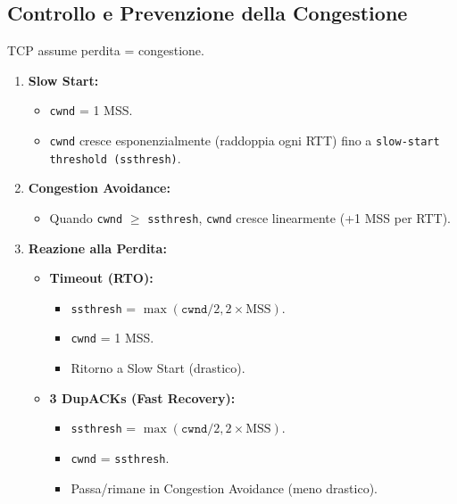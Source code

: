 \subsection{Controllo e Prevenzione della Congestione}
TCP assume perdita = congestione.
\begin{enumerate}
    \item \textbf{Slow Start:}
    \begin{itemize}
        \item \texttt{cwnd} = 1 MSS.
        \item \texttt{cwnd} cresce esponenzialmente (raddoppia ogni RTT) fino a \texttt{slow-start threshold (ssthresh)}.
    \end{itemize}
    \item \textbf{Congestion Avoidance:}
    \begin{itemize}
        \item Quando \texttt{cwnd} $\ge$ \texttt{ssthresh}, \texttt{cwnd} cresce linearmente (+1 MSS per RTT).
    \end{itemize}
    \item \textbf{Reazione alla Perdita:}
    \begin{itemize}
        \item \textbf{Timeout (RTO):}
        \begin{itemize}
            \item \texttt{ssthresh} = $\max(\texttt{cwnd}/2, 2 \times \text{MSS})$.
            \item \texttt{cwnd} = 1 MSS.
            \item Ritorno a Slow Start (drastico).
        \end{itemize}
        \item \textbf{3 DupACKs (Fast Recovery):}
        \begin{itemize}
            \item \texttt{ssthresh} = $\max(\texttt{cwnd}/2, 2 \times \text{MSS})$.
            \item \texttt{cwnd} = \texttt{ssthresh}.
            \item Passa/rimane in Congestion Avoidance (meno drastico).
        \end{itemize}
    \end{itemize}
\end{enumerate}

